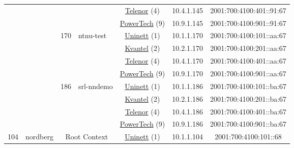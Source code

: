 \begin{small}
\begin{center}
\begin{longtable}{|c|c|c|c|c|c|c|c|}
  &  &  &  & \multicolumn{2}{|c|}{\tiny{\href{https://www.telenor.no}{Telenor} (4)}} & \tiny{10.4.1.145} & \tiny{2001:700:4100:401::91:67} \\* \cline{5-5}\cline{6-6}\cline{7-7}\cline{8-8}
  &  &  &  & \multicolumn{2}{|c|}{\tiny{\href{http://www.powertech.no}{PowerTech} (9)}} & \tiny{10.9.1.145} & \tiny{2001:700:4100:901::91:67} \\* \cline{3-3}\cline{4-4}\cline{5-5}\cline{6-6}\cline{7-7}\cline{8-8}
  &  & \multirow{4}{*}{\tiny{170}} & \multicolumn{1}{|l|}{\multirow{4}{*}{\tiny{ntnu-test}}} & \multicolumn{2}{|c|}{\tiny{\href{https://www.uninett.no}{Uninett} (1)}} & \tiny{10.1.1.170} & \tiny{2001:700:4100:101::aa:67} \\* \cline{5-5}\cline{6-6}\cline{7-7}\cline{8-8}
  &  &  &  & \multicolumn{2}{|c|}{\tiny{\href{http://kvantel.no}{Kvantel} (2)}} & \tiny{10.2.1.170} & \tiny{2001:700:4100:201::aa:67} \\* \cline{5-5}\cline{6-6}\cline{7-7}\cline{8-8}
  &  &  &  & \multicolumn{2}{|c|}{\tiny{\href{https://www.telenor.no}{Telenor} (4)}} & \tiny{10.4.1.170} & \tiny{2001:700:4100:401::aa:67} \\* \cline{5-5}\cline{6-6}\cline{7-7}\cline{8-8}
  &  &  &  & \multicolumn{2}{|c|}{\tiny{\href{http://www.powertech.no}{PowerTech} (9)}} & \tiny{10.9.1.170} & \tiny{2001:700:4100:901::aa:67} \\* \cline{3-3}\cline{4-4}\cline{5-5}\cline{6-6}\cline{7-7}\cline{8-8}
  &  & \multirow{4}{*}{\tiny{186}} & \multicolumn{1}{|l|}{\multirow{4}{*}{\tiny{srl-nndemo}}} & \multicolumn{2}{|c|}{\tiny{\href{https://www.uninett.no}{Uninett} (1)}} & \tiny{10.1.1.186} & \tiny{2001:700:4100:101::ba:67} \\* \cline{5-5}\cline{6-6}\cline{7-7}\cline{8-8}
  &  &  &  & \multicolumn{2}{|c|}{\tiny{\href{http://kvantel.no}{Kvantel} (2)}} & \tiny{10.2.1.186} & \tiny{2001:700:4100:201::ba:67} \\* \cline{5-5}\cline{6-6}\cline{7-7}\cline{8-8}
  &  &  &  & \multicolumn{2}{|c|}{\tiny{\href{https://www.telenor.no}{Telenor} (4)}} & \tiny{10.4.1.186} & \tiny{2001:700:4100:401::ba:67} \\* \cline{5-5}\cline{6-6}\cline{7-7}\cline{8-8}
  &  &  &  & \multicolumn{2}{|c|}{\tiny{\href{http://www.powertech.no}{PowerTech} (9)}} & \tiny{10.9.1.186} & \tiny{2001:700:4100:901::ba:67} \\ \hline
 \multirow{24}{*}{\tiny{104}} & \multicolumn{1}{|l|}{\multirow{24}{*}{\tiny{nordberg}}} & \multicolumn{2}{|c|}{\multirow{4}{*}{\tiny{Root Context}}} & \multicolumn{2}{|c|}{\tiny{\href{https://www.uninett.no}{Uninett} (1)}} & \tiny{10.1.1.104} & \tiny{2001:700:4100:101::68} \\* \cline{5-5}\cline{6-6}\cline{7-7}\cline{8-8}

\end{longtable}
\end{center}
\end{small}
